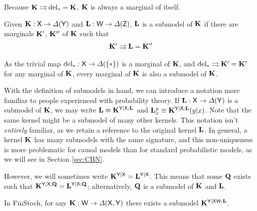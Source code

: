 Because $\mathbf{K}\rightrightarrows \text{del}_*=\mathbf{K}$, $\mathbf{K}$ is always a marginal of itself.

\begin{definition}[Submodel]
Given $\mathbf{K}:\mathsf{X}\to \Delta(\mathsf{Y})$ and $\mathbf{L}:\mathsf{W}\to\Delta(\mathsf{Z})$, $\mathbf{L}$ is a submodel of $\mathbf{K}$ if there are marginals $\mathbf{K}'$, $\mathbf{K}''$ of $\mathbf{K}$ such that
\begin{align}
	 \mathbf{K}'\rightrightarrows\mathbf{L} = \mathbf{K}''
\end{align}
\end{definition}

As the trivial map $\text{del}_*:\mathsf{X}\to\Delta(\{*\})$ is a marginal of $\mathbf{K}$, and $\text{del}_*\rightrightarrows\mathbf{K}'=\mathbf{K}'$ for any marginal of $\mathbf{K}$, every marginal of $\mathbf{K}$ is also a submodel of $\mathbf{K}$.

With the definition of submodels in hand, we can introduce a notation more familiar to people experienced with probability theory. If $\mathbf{L}:\mathsf{X}\to \Delta(\mathsf{Y})$ is a submodel of $\mathbf{K}$, we may write $\mathbf{L}\equiv \mathbf{K}^{\mathsf{Y}|\mathsf{X};\mathbf{L}}$ and $\mathbf{L}_x^y\equiv \mathbf{K}^{\mathsf{Y}|\mathsf{X};\mathbf{L}}(y|x)$. Note that the same kernel might be a submodel of many other kernels. This notation isn't \emph{entirely} familiar, as we retain a reference to the original kernel $\mathbf{L}$. In general, a kernel $\mathbf{K}$ has many submodels with the same signature, and this non-uniqueness is more problematic for causal models than for standard probabilistic models, as we will see in Section \ref{sec:CBN}.

However, we will sometimes write $\mathbf{K}^{\mathsf{Y}|\mathsf{X}}=\mathbf{L}^{\mathsf{Y}|\mathsf{X}}$. This means that some $\mathbf{Q}$ exists such that $\mathbf{K}^{\mathsf{Y}|\mathsf{X};\mathbf{Q}}=\mathbf{L}^{\mathsf{Y}|\mathsf{X};\mathbf{Q}}$; alternatively, $\mathbf{Q}$ is a submodel of $\mathbf{K}$ and $\mathbf{L}$.

\begin{lemma}\label{lem:subm_exist}
In FinStoch, for any $\mathbf{K}:\mathsf{W}\to \Delta(\mathsf{X},\mathsf{Y})$ there exists a submodel $\mathbf{K}^{\mathsf{Y}|\mathsf{XW};\mathbf{L}}$.
\end{lemma}

